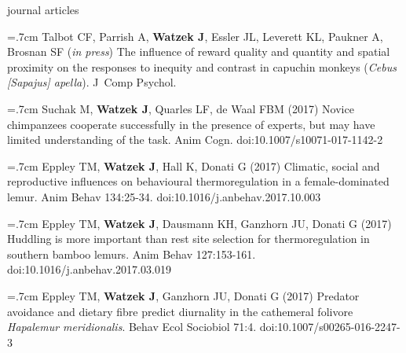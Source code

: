 \documentclass[]{friggeri-cv}
\begin{document}




{\subfont\large{} journal articles}

\hangindent=.7cm Talbot CF, Parrish A, \textbf{Watzek J}, Essler JL, Leverett KL, Paukner A, Brosnan SF (\emph{in press}) The influence of reward quality and quantity and spatial proximity on the responses to inequity and contrast in capuchin monkeys (\emph{Cebus [Sapajus] apella}). J~Comp Psychol.

\hangindent=.7cm Suchak M, \textbf{Watzek J}, Quarles LF, de Waal FBM (2017) Novice chimpanzees cooperate successfully in the presence of experts, but may have limited understanding of the task. Anim Cogn. doi:10.1007/s10071-017-1142-2

\hangindent=.7cm Eppley TM, \textbf{Watzek J}, Hall K, Donati G (2017) Climatic, social and reproductive influences on behavioural thermoregulation in a female-dominated lemur. Anim Behav 134:25-34. doi:10.1016/j.anbehav.2017.10.003

\hangindent=.7cm Eppley TM, \textbf{Watzek J}, Dausmann KH, Ganzhorn JU, Donati G (2017) Huddling is more important than rest site selection for thermoregulation in southern bamboo lemurs. Anim Behav 127:153-161. doi:10.1016/j.anbehav.2017.03.019

\hangindent=.7cm Eppley TM, \textbf{Watzek J}, Ganzhorn JU, Donati G (2017) Predator avoidance and dietary fibre predict diurnality in the cathemeral folivore \emph{Hapalemur meridionalis}. Behav Ecol Sociobiol 71:4. doi:10.1007/s00265-016-2247-3 \\[.5cm]

\end{document}
